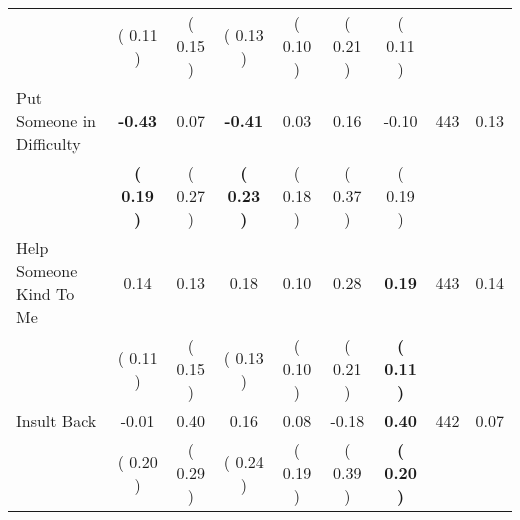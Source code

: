 \begin{tabular}{lcccccccc}
 & (     0.11 ) & (     0.15 ) & (     0.13 ) & (     0.10 ) & (     0.21 ) & (     0.11 ) & \\
Put Someone in Difficulty & \textbf{    -0.43} &      0.07 & \textbf{    -0.41} &      0.03 &      0.16 &     -0.10 & 443 &       0.13 \\ 
 & \textbf{(     0.19 )} & (     0.27 ) & \textbf{(     0.23 )} & (     0.18 ) & (     0.37 ) & (     0.19 ) & \\
Help Someone Kind To Me &      0.14 &      0.13 &      0.18 &      0.10 &      0.28 & \textbf{     0.19} & 443 &       0.14 \\ 
 & (     0.11 ) & (     0.15 ) & (     0.13 ) & (     0.10 ) & (     0.21 ) & \textbf{(     0.11 )} & \\
Insult Back &     -0.01 &      0.40 &      0.16 &      0.08 &     -0.18 & \textbf{     0.40} & 442 &       0.07 \\ 
 & (     0.20 ) & (     0.29 ) & (     0.24 ) & (     0.19 ) & (     0.39 ) & \textbf{(     0.20 )} & \\
\bottomrule
\end{tabular}
